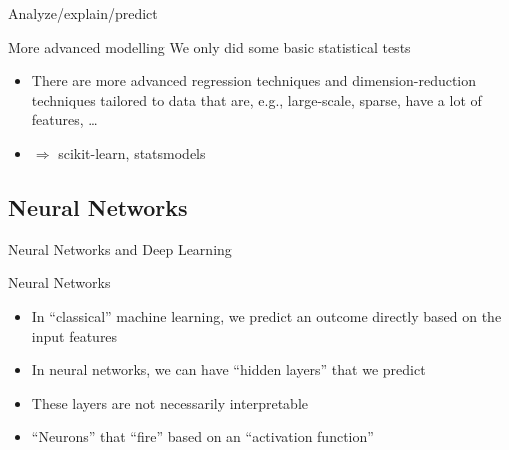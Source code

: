 \documentclass{beamer}
\begin{document}
\begin{frame}{Analyze/explain/predict}
	\begin{block}{More advanced modelling}
We only did some basic statistical tests
		\begin{itemize}
			\item There are more advanced regression techniques and dimension-reduction techniques tailored to data that are, e.g., large-scale, sparse, have a lot of features, \ldots
		\item $\Rightarrow$ scikit-learn, statsmodels
		\end{itemize}
	\end{block}
\end{frame}


\subsection{Neural Networks}

\begin{frame}[plain]
Neural Networks and Deep Learning
\end{frame}

\begin{frame}{Neural Networks}
\begin{itemize}
	\item In ``classical'' machine learning, we predict an outcome directly based on the input features
	\item In neural networks, we can have ``hidden layers'' that we predict
	\item These layers are not necessarily interpretable
	\item ``Neurons'' that ``fire'' based on an ``activation function''
\end{itemize}

\end{frame}
\end{document}
